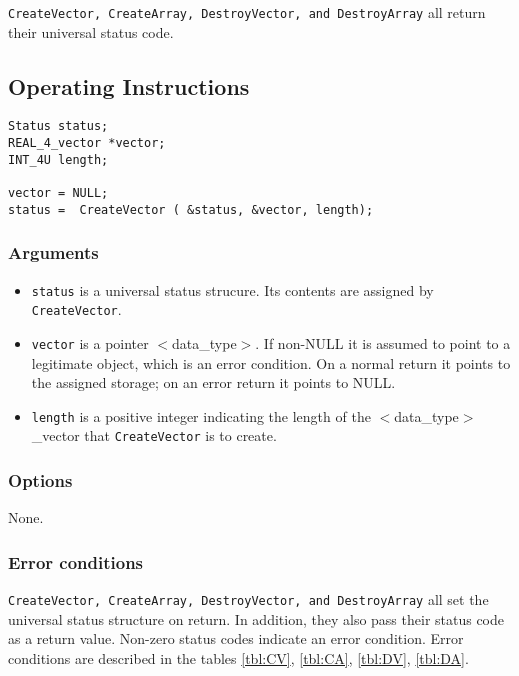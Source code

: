 \documentclass{article}
\begin{document}
{\tt CreateVector, CreateArray, DestroyVector, and DestroyArray\/} all
return their universal status code. 

\subsection{Operating Instructions}


\begin{verbatim}
Status status; 
REAL_4_vector *vector;
INT_4U length;

vector = NULL;
status =  CreateVector ( &status, &vector, length);
\end{verbatim}

\subsubsection{Arguments}


\begin{itemize}
\item {\tt status\/} is a universal status strucure. Its contents are 
assigned by {\tt CreateVector}.
\item {\tt vector\/} is a pointer $<$data\_type$>$. If non-NULL it is
assumed to point to a legitimate object, which is an error
condition. On a normal return it points to the assigned storage; on an
error return it points to NULL. 
\item {\tt length\/} is a positive integer indicating the length of
the $<$data\_type$>$\_vector that {\tt CreateVector} is to create. 
\end{itemize}

\subsubsection{Options}

None. 

\subsubsection{Error conditions}


{\tt CreateVector, CreateArray, DestroyVector, and DestroyArray\/} all
set the universal status structure on return. In addition, they also 
pass their status code as a return value. Non-zero status codes
indicate an error condition. Error conditions are described in the
tables \ref{tbl:CV}, \ref{tbl:CA}, \ref{tbl:DV}, \ref{tbl:DA}. 
\end{document}
